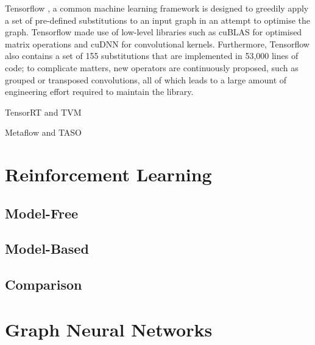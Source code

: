 Tensorflow \cite{tensorflow2015-whitepaper}, a common machine learning framework is designed to greedily apply a set of pre-defined substitutions to an input graph in an attempt to optimise the graph. Tensorflow made use of low-level libraries such as cuBLAS \cite{cublas2008} for optimised matrix operations and cuDNN \cite{chetlur2014cudnn} for convolutional kernels. Furthermore, Tensorflow also contains a set of 155 substitutions that are implemented in 53,000 lines of code; to complicate matters, new operators are continuously proposed, such as grouped or transposed convolutions, all of which leads to a large amount of engineering effort required to maintain the library.

TensorRT and TVM

Metaflow and TASO

\section{Reinforcement Learning}
\subsection{Model-Free}
\subsection{Model-Based}
\subsection{Comparison}

\section{Graph Neural Networks}
